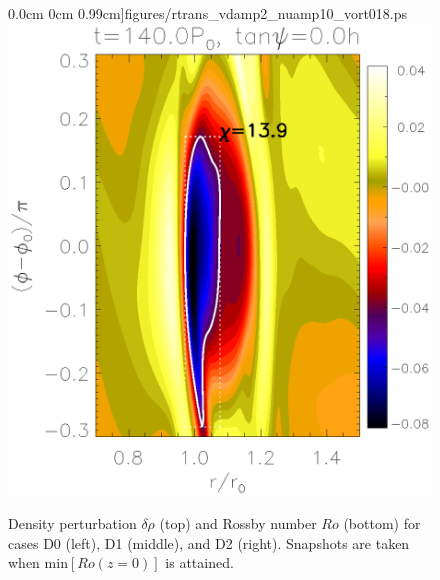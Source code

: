 \begin{figure}
      0.0cm 0cm
      0.99cm]{figures/rtrans_vdamp2_nuamp10_vort018.ps}\includegraphics[scale=.27,clip=true,clip=true,trim=2.3cm
      0.0cm 0cm
      0.99cm]{figures/rtrans_vdamp3_nuamp10_vort014.ps}
    \caption{Density perturbation $\delta\rho$ (top) and
      Rossby number $Ro$ (bottom) for cases D0 (left), D1
      (middle), and D2 (right). Snapshots are taken when
      $\mathrm{min}[Ro(z=0)]$ is attained. 
      \label{rtrans_vdamp0_nuamp10_2}}
\end{figure}


